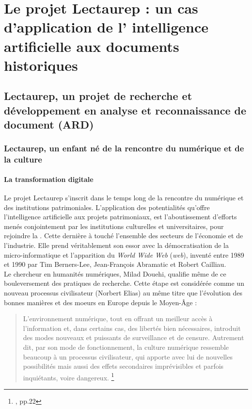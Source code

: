 \part{Le projet Lectaurep : un cas d'application de l' \og intelligence artificielle\fg{}  aux documents historiques}\label{partie_1}

\chapter{Lectaurep, un projet de recherche et développement en analyse et reconnaissance de document (ARD)}

\section{Lectaurep, un enfant né de la rencontre du numérique et de la culture}

\subsection{La transformation digitale}

Le projet Lectaurep s'inscrit dans le temps long de la rencontre du numérique et des institutions patrimoniales. L'application des potentialités qu'offre l'intelligence artificielle aux projets patrimoniaux, est l'aboutissement d'efforts menés conjointement par les institutions culturelles et universitaires, pour rejoindre la . Cette dernière à touché l'ensemble des secteurs de l'économie et de l'industrie. Elle prend véritablement son essor avec la démocratisation de la micro-informatique et l'apparition du \textit{World Wide Web} (\textit{web}), inventé entre 1989 et 1990 par Tim Berners-Lee, Jean-François Abramatic et Robert Cailliau.\\

Le chercheur en humanités numériques, Milad Douehi, qualifie même de  ce bouleversement des pratiques de recherche. Cette étape est considérée comme un nouveau processus civilisateur (Norbert Elias) au même titre que l'évolution des bonnes manières et des moeurs en Europe depuis le Moyen-Âge : 

\begin{quote}
    L'environnement numérique, tout en offrant un meilleur accès à l'information et, dans certains cas, des libertés bien nécessaires, introduit des modes nouveaux et puissants de surveillance et de censure. Autrement dit, par son mode de fonctionnement, la culture numérique ressemble beaucoup à un processus civilisateur, qui apporte avec lui de nouvelles possibilités mais aussi des effets secondaires imprévisibles et parfois inquiétants, voire dangereux. \footnote{\cite{doueihi_grande_2011}, pp.22}
\end{quote}

